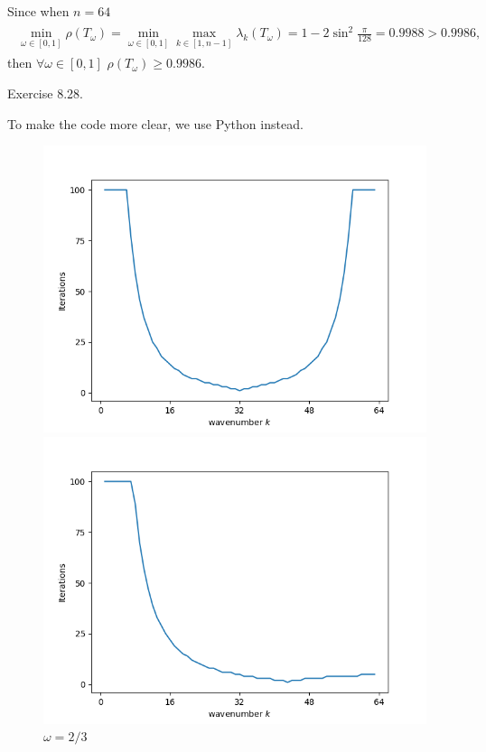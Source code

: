 \documentclass{homework}
\begin{document}
	Since when $n = 64$
	\begin{eqnarray}
		\begin{aligned}
			\min_{\omega\in[0,1]}\rho(T_\omega) = \min_{\omega\in[0,1]} \max_{k\in[1,n-1]} \lambda_k(T_\omega) = 1 - 2\sin^2 \frac{\pi}{128}
			= 0.9988 > 0.9986,
		\end{aligned}
	\end{eqnarray}
	then $\forall \omega\in[0,1]$ $\rho(T_\omega) \geq 0.9986$.
	
\question Exercise 8.28.

	To make the code more clear, we use Python instead.
	\begin{figure}[H]
		\begin{minipage}[t]{0.45\textwidth}
			\centering
			\includegraphics[scale = 0.5]{Ex8_28_a.png}
			\caption{$\omega = 1$}
		\end{minipage}
		\qquad
		\begin{minipage}[t]{0.45\textwidth}
			\centering
			\includegraphics[scale = 0.5]{Ex8_28_b.png}
			\caption{$\omega = 2/3$}
		\end{minipage}
	\end{figure}
	
\end{document}
